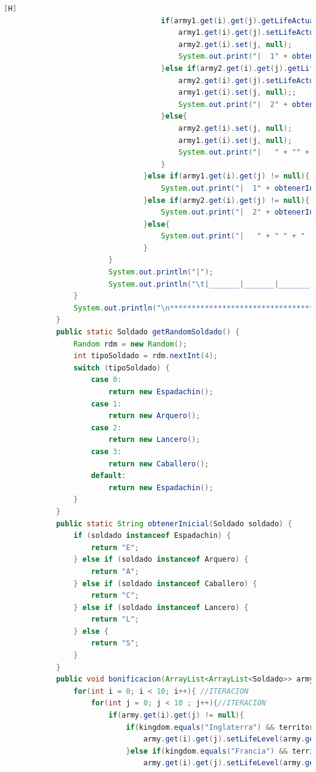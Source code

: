 \documentclass{article}
\begin{document}
\begin{lstlisting}[language=java,caption={Las lineas de codigos de la clase Mapa creada:}][H]
									if(army1.get(i).get(j).getLifeActual() > army2.get(i).get(j).getLifeActual()){
										army1.get(i).get(j).setLifeActual(army1.get(i).get(j).getLifeActual() - army2.get(i).get(j).getLifeActual()); //Cambiamos 
										army2.get(i).set(j, null); 
										System.out.print("|  1" + obtenerInicial(army1.get(i).get(j)) + "1  ");
									}else if(army2.get(i).get(j).getLifeActual() > army1.get(i).get(j).getLifeActual()){
										army2.get(i).get(j).setLifeActual(army2.get(i).get(j).getLifeActual() - army1.get(i).get(j).getLifeActual());
										army1.get(i).set(j, null);;
										System.out.print("|  2" + obtenerInicial(army2.get(i).get(j)) + "2  ");
									}else{
										army2.get(i).set(j, null);
										army1.get(i).set(j, null);
										System.out.print("|   " + "" + "   ");
									}
								}else if(army1.get(i).get(j) != null){
									System.out.print("|  1" + obtenerInicial(army1.get(i).get(j)) + "1  ");
								}else if(army2.get(i).get(j) != null){
									System.out.print("|  2" + obtenerInicial(army2.get(i).get(j)) + "2  ");
								}else{
									System.out.print("|   " + " " + "   ");
								}
						}
						System.out.println("|");
						System.out.println("\t|_______|_______|_______|_______|_______|_______|_______|_______|_______|_______|");
				}
				System.out.println("\n*********************************");
			}
			public static Soldado getRandomSoldado() {
				Random rdm = new Random();
				int tipoSoldado = rdm.nextInt(4);
				switch (tipoSoldado) {
					case 0:
						return new Espadachin();
					case 1:
						return new Arquero();
					case 2:
						return new Lancero();
					case 3:
						return new Caballero();
					default:
						return new Espadachin();
				}
			}
			public static String obtenerInicial(Soldado soldado) {
				if (soldado instanceof Espadachin) {
					return "E";
				} else if (soldado instanceof Arquero) {
					return "A";
				} else if (soldado instanceof Caballero) {
					return "C";
				} else if (soldado instanceof Lancero) {
					return "L";
				} else {
					return "S";
				}
			}
			public void bonificacion(ArrayList<ArrayList<Soldado>> army, String territory , String kingdom) {
				for(int i = 0; i < 10; i++){ //ITERACION
					for(int j = 0; j < 10 ; j++){//ITERACION
						if(army.get(i).get(j) != null){
							if(kingdom.equals("Inglaterra") && territory.equals("bosque")){
								army.get(i).get(j).setLifeLevel(army.get(i).get(j).getLifeLevel() + 1);
							}else if(kingdom.equals("Francia") && territory.equals("campo abierto")){
								army.get(i).get(j).setLifeLevel(army.get(i).get(j).getLifeLevel() + 1);

\end{lstlisting}
\end{document}
